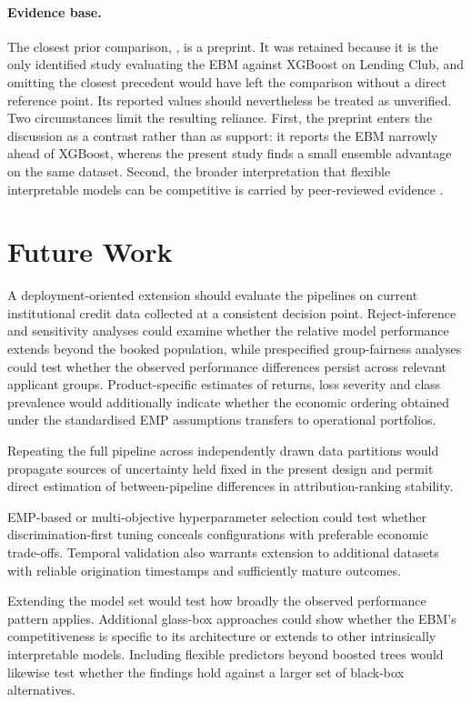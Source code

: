 \paragraph{Evidence base.}
The closest prior comparison, \citet{schwartzEnhancingMLModels2025}, is a preprint. It
was retained because it is the only identified study evaluating the EBM against
XGBoost on Lending Club, and omitting the closest precedent would have left the
comparison without a direct reference point. Its reported values should nevertheless be
treated as unverified. Two circumstances limit the resulting reliance. First, the
preprint enters the discussion as a contrast rather than as support: it reports the EBM
narrowly ahead of XGBoost, whereas the present study finds a small ensemble advantage on
the same dataset. Second, the broader interpretation that flexible interpretable models
can be competitive is carried by peer-reviewed evidence
\citep{amekoeExploringAccuracyInterpretability2024b}.


\section{Future Work}\label{sec:future}

A deployment-oriented extension should evaluate the pipelines on current institutional
credit data collected at a consistent decision point. Reject-inference and sensitivity
analyses could examine whether the relative model performance extends beyond the booked
population, while prespecified group-fairness
analyses could test whether the observed performance differences persist across
relevant applicant groups. Product-specific
estimates of returns, loss severity and class prevalence would additionally indicate
whether the economic ordering obtained under the standardised EMP assumptions transfers
to operational portfolios.

Repeating the full pipeline across independently drawn data partitions would propagate
sources of uncertainty held fixed in the present design and permit direct estimation of
between-pipeline differences in attribution-ranking stability.

EMP-based or
multi-objective hyperparameter selection could test whether discrimination-first tuning
conceals configurations with preferable economic trade-offs. Temporal validation also
warrants extension to additional datasets with reliable origination timestamps and
sufficiently mature outcomes.

Extending the model set would test how broadly the observed performance pattern applies.
Additional glass-box approaches could show whether the EBM's competitiveness is specific
to its architecture or extends to other intrinsically interpretable models. Including
flexible predictors beyond boosted trees would likewise test whether the findings hold
against a larger set of black-box alternatives.

